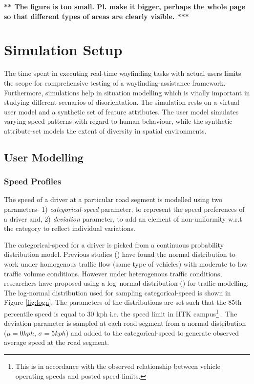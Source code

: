 \documentclass{iitkthesis}
\begin{document}
{\bf *** The figure is too small. Pl. make it bigger, perhaps the whole page
so that different types of areas are clearly visible. ***}

 \section{Simulation Setup} 
The time spent in executing real-time wayfinding tasks with actual
users limits the scope 
for comprehensive testing of a wayfinding-assistance framework. Furthermore,
simulations help in situation modelling which is vitally important in 
studying different scenarios of disorientation. The simulation rests on a 
virtual user model and a synthetic set of feature attributes. The user model 
simulates varying speed patterns with regard to human behaviour, while 
the synthetic attribute-set models the extent of diversity in spatial 
environments.
  \subsection{User Modelling}
  \subsubsection*{Speed Profiles}
The speed of a driver at a particular road segment is modelled using two 
parameters- 1) \textit{categorical-speed} parameter, to represent the 
speed preferences of a driver and, 2) \textit{deviation} parameter, to 
add an element of non-uniformity w.r.t the category to reflect individual
variations.

The categorical-speed for a driver is picked from a continuous 
probability distribution model. Previous studies (\cite{leong,mclean}) 
have found the normal distribution to work under homogenous traffic flow 
(same type of vehicles) with moderate to low traffic volume conditions. 
However under heterogenous traffic conditions, researchers have proposed 
using a log–normal distribution (\cite{gerl}) for traffic modelling. The 
log-normal distribution used for sampling categorical-speed is shown in 
Figure \ref{fig:logn}. The parameters of the distributions are set such 
that the 85th percentile speed is equal to 30 kph i.e. the speed limit in 
IITK campus\footnote{This is in accordance with the observed relationship 
between vehicle operating speeds and posted speed limits.} . The 
deviation parameter is sampled at each road segment from a normal 
distribution ($\mu=0 kph$, $\sigma=5 kph$) and added to the 
categorical-speed to generate observed average speed at the road 
segment.
\end{document}
